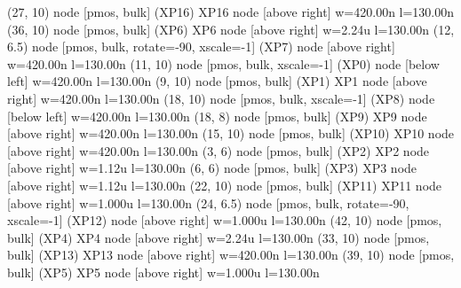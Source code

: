 \begin{circuitikz}[american]
	(27, 10) node [pmos, bulk] (XP16) {XP16} node [above right] {\tiny {w=420.00n l=130.00n}}
	(36, 10) node [pmos, bulk] (XP6) {XP6} node [above right] {\tiny {w=2.24u l=130.00n}}
	(12, 6.5) node [pmos, bulk, rotate=-90, xscale=-1] (XP7) {} node [above right] {\tiny {w=420.00n l=130.00n}}
	(11, 10) node [pmos, bulk, xscale=-1] (XP0) {} node [below left] {\tiny {w=420.00n l=130.00n}}
	(9, 10) node [pmos, bulk] (XP1) {XP1} node [above right] {\tiny {w=420.00n l=130.00n}}
	(18, 10) node [pmos, bulk, xscale=-1] (XP8) {} node [below left] {\tiny {w=420.00n l=130.00n}}
	(18, 8) node [pmos, bulk] (XP9) {XP9} node [above right] {\tiny {w=420.00n l=130.00n}}
	(15, 10) node [pmos, bulk] (XP10) {XP10} node [above right] {\tiny {w=420.00n l=130.00n}}
	(3, 6) node [pmos, bulk] (XP2) {XP2} node [above right] {\tiny {w=1.12u l=130.00n}}
	(6, 6) node [pmos, bulk] (XP3) {XP3} node [above right] {\tiny {w=1.12u l=130.00n}}
	(22, 10) node [pmos, bulk] (XP11) {XP11} node [above right] {\tiny {w=1.000u l=130.00n}}
	(24, 6.5) node [pmos, bulk, rotate=-90, xscale=-1] (XP12) {} node [above right] {\tiny {w=1.000u l=130.00n}}
	(42, 10) node [pmos, bulk] (XP4) {XP4} node [above right] {\tiny {w=2.24u l=130.00n}}
	(33, 10) node [pmos, bulk] (XP13) {XP13} node [above right] {\tiny {w=420.00n l=130.00n}}
	(39, 10) node [pmos, bulk] (XP5) {XP5} node [above right] {\tiny {w=1.000u l=130.00n}}



\end{circuitikz}
